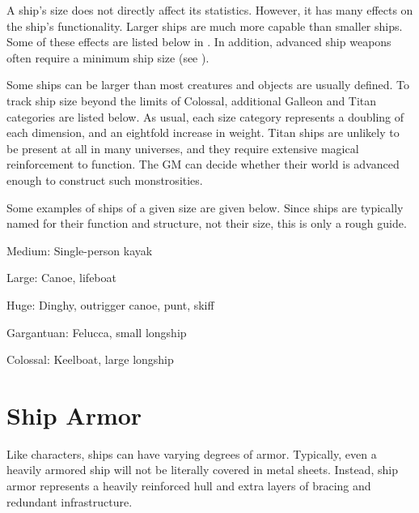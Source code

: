         A ship's size does not directly affect its statistics.
        However, it has many effects on the ship's functionality.
        Larger ships are much more capable than smaller ships.
        Some of these effects are listed below in .
        In addition, advanced ship weapons often require a minimum ship size (see ).

        Some ships can be larger than most creatures and objects are usually defined.
        To track ship size beyond the limits of Colossal, additional Galleon and Titan categories are listed below.
        As usual, each size category represents a doubling of each dimension, and an eightfold increase in weight.
        Titan ships are unlikely to be present at all in many universes, and they require extensive magical reinforcement to function.
        The GM can decide whether their world is advanced enough to construct such monstrosities.

        Some examples of ships of a given size are given below.
        Since ships are typically named for their function and structure, not their size, this is only a rough guide.
        \begin{raggeditemize}
            \item Medium: Single-person kayak
            \item Large: Canoe, lifeboat
            \item Huge: Dinghy, outrigger canoe, punt, skiff
            \item Gargantuan: Felucca, small longship
            \item Colossal: Keelboat, large longship
        \end{raggeditemize}

\section{Ship Armor}
    Like characters, ships can have varying degrees of armor.
    Typically, even a heavily armored ship will not be literally covered in metal sheets.
    Instead, ship armor represents a heavily reinforced hull and extra layers of bracing and redundant infrastructure.

